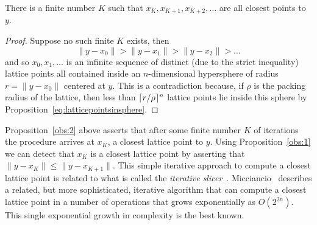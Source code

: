 \documentclass[final,leqno]{siamltex}
\begin{document}

 \begin{proposition}\label{obs:2}
 There is a finite number $K$ such that $x_K, x_{K+1}, x_{K+2}, \dots$ are all closest points to $y$.
 \end{proposition}
 \begin{proof}
Suppose no such finite $K$ exists, then
\[
\|y - x_0\| >  \|y - x_1\| > \|y - x_2\| > \dots
\]
and so $x_0,x_1,\dots$ is an infinite sequence of distinct (due to the strict inequality) lattice points  all contained inside an $n$-dimensional hypersphere of radius $r = \|y - x_0\|$ centered at $y$.  This is a contradiction because, if $\rho$ is the packing radius of the lattice, then less than $\lceil r/\rho \rceil^n$ lattice points lie inside this sphere by Proposition~\ref{eq:latticepointsinsphere}. 
\end{proof}

Proposition~\ref{obs:2} above asserts that after some finite number $K$ of iterations the procedure arrives at $x_K$, a closest lattice point to $y$.  Using Proposition~\ref{obs:1} we can detect that $x_K$ is a closest lattice point by asserting that $\|y - x_K\| \leq \| y - x_{K+1} \|$.
This simple iterative approach to compute a closest lattice point is related to what is called the \emph{iterative slicer}~\cite{Shalvi_iterativeslicer_2009}.  Micciancio~\cite{Micciancio09adeterministic} describes a related, but more sophisticated, iterative algorithm that can compute a closest lattice point in a number of operations that grows exponentially as $O(2^{2 n})$.  This single exponential growth in complexity is the best known.  %
\end{document}
